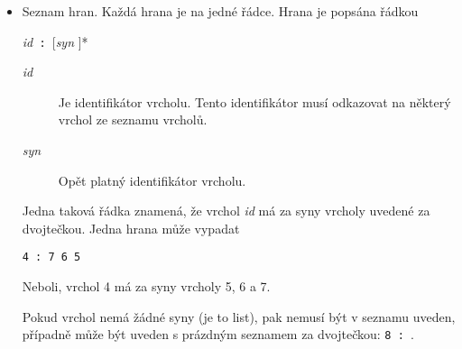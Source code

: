 \documentclass{article}
\begin{document}
\begin{itemize}
  \item Seznam hran. Každá hrana je na jedné řádce. Hrana je popsána řádkou
  	\begin{center}\textit{id}\texttt{ : }[\textit{syn }]*\end{center}
  	\begin{description}
  	\item[\textit{id}] Je identifikátor vrcholu. Tento identifikátor musí odkazovat na některý vrchol ze seznamu vrcholů.
  	\item[\textit{syn}] Opět platný identifikátor vrcholu. 
  	\end{description}
  	Jedna taková řádka znamená, že vrchol \textit{id} má za syny vrcholy uvedené za dvojtečkou. Jedna hrana může vypadat
  	\begin{center}\verb+4 : 7 6 5+\end{center}Neboli, vrchol 4 má za syny vrcholy 5, 6 a 7.
  	
  	Pokud vrchol nemá žádné syny (je to list), pak nemusí být v seznamu uveden, případně může být uveden s prázdným
  	seznamem za dvojtečkou: \verb+8 : +.
\end{itemize}
\end{document}
